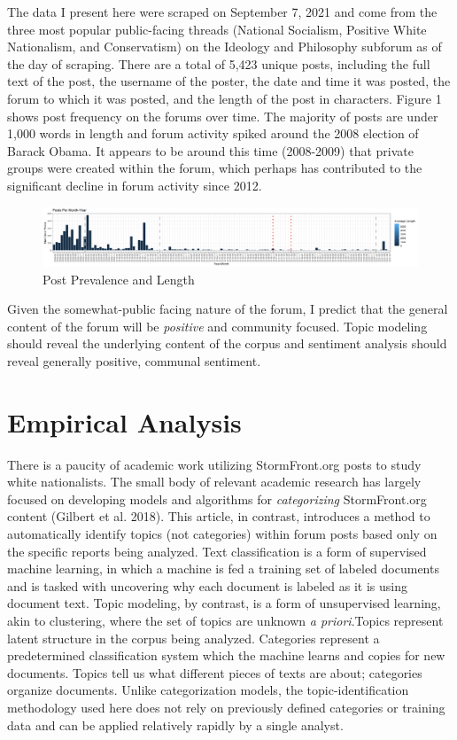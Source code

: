 \documentclass[12pt]{paper}
\begin{document}
The data I present here were scraped on September 7, 2021 and come from the three most popular public-facing threads (National Socialism, Positive White Nationalism, and Conservatism) on the Ideology and Philosophy subforum as of the day of scraping. There are a total of 5,423 unique posts, including the full text of the post, the username of the poster, the date and time it was posted, the forum to which it was posted, and the length of the post in characters. Figure 1 shows post frequency on the forums over time. The majority of posts are under 1,000 words in length and forum activity spiked around the 2008 election of Barack Obama. It appears to be around this time (2008-2009) that private groups were created within the forum, which perhaps has contributed to the significant decline in forum activity since 2012.

\begin{figure} \centering
	\includegraphics[width=.8\linewidth]{figs/ip_frequency_length.png}
	\caption{Post Prevalence and Length}
	\label{}
\end{figure}

Given the somewhat-public facing nature of the forum, I predict that the general content of the forum will be \textit{positive} and community focused. Topic modeling should reveal the underlying content of the corpus and sentiment analysis should reveal generally positive, communal sentiment.

\section{Empirical Analysis}
There is a paucity of academic work utilizing StormFront.org posts to study white nationalists. The small body of relevant academic research has largely focused on developing models and algorithms for \textit{categorizing} StormFront.org content (Gilbert et al. 2018). This article, in contrast, introduces a method to automatically identify topics (not categories) within forum posts based only on the specific reports being analyzed. Text classification is a form of supervised machine learning, in which a machine is fed a training set of labeled documents and is tasked with uncovering why each document is labeled as it is using document text. Topic modeling, by contrast, is a form of unsupervised learning, akin to clustering, where the set of topics are unknown \textit{a priori}.Topics represent latent structure in the corpus being analyzed. Categories represent a predetermined classification system which the machine learns and copies for new documents. Topics tell us what different pieces of texts are about; categories organize documents. Unlike categorization models, the topic-identification methodology used here does not rely on previously defined categories or training data and can be applied relatively rapidly by a single analyst.
\end{document}
